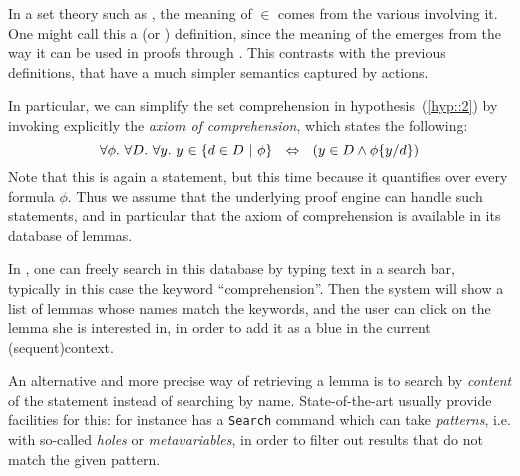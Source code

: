 \AP
In a set theory such as , the meaning of $\in$ comes from the various
 involving it. One might call this a  (or
) definition, since the meaning of the  emerges
from the way it can be used in proofs through . This contrasts with
the previous  definitions, that have a much simpler semantics
captured by  actions.

In particular, we can simplify the set comprehension in
hypothesis~(\ref{hyp::2}) by invoking explicitly the \emph{axiom of
comprehension}, which states the following:
$$\forall \phi.\ \forall D.\ \forall y.\ y \in \left\{d \in D ~\middle|~ \phi\right\}
~~\Leftrightarrow~~ (y \in D \land \phi \{ y / d \})$$
Note that this is again a  statement, but this time because it
quantifies over every formula $\phi$. Thus we assume that the underlying proof
engine can handle such  statements, and in particular that the
axiom of comprehension is available in its database of lemmas.

In , one can freely search in this database by typing text in a
search bar, typically in this case the keyword ``comprehension''. Then the
system will show a list of lemmas whose names match the keywords, and the
user can click on the lemma she is interested in, in order to add it as a
blue  in the current \kl(sequent){context}.

An alternative and more precise way of retrieving a lemma is to search by
\emph{content} of the statement instead of searching by name. State-of-the-art
 usually provide facilities for this: for instance 
has a \texttt{Search} command which can take \emph{patterns}, i.e. 
with so-called \emph{holes} or \emph{metavariables}, in order to filter out
results that do not match the given pattern.

